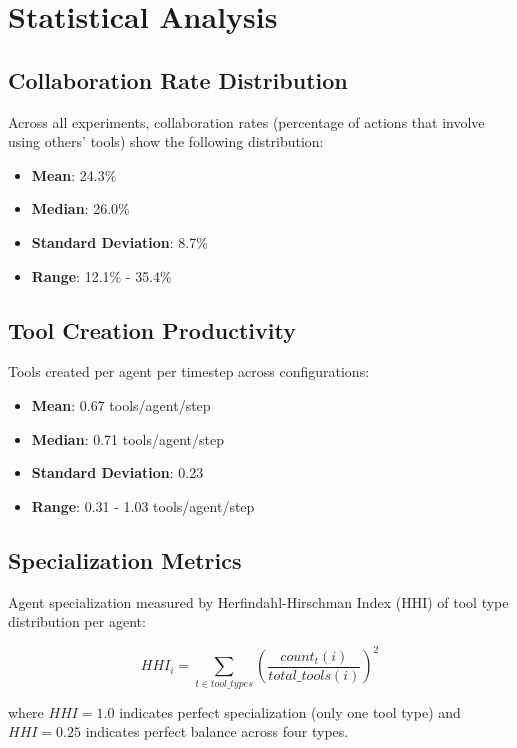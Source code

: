 \documentclass[10pt]{article}
\begin{document}
\section{Statistical Analysis}

\subsection{Collaboration Rate Distribution}

Across all experiments, collaboration rates (percentage of actions that involve using others' tools) show the following distribution:

\begin{itemize}
\item \textbf{Mean}: 24.3\%
\item \textbf{Median}: 26.0\%
\item \textbf{Standard Deviation}: 8.7\%
\item \textbf{Range}: 12.1\% - 35.4\%
\end{itemize}

\subsection{Tool Creation Productivity}

Tools created per agent per timestep across configurations:

\begin{itemize}
\item \textbf{Mean}: 0.67 tools/agent/step
\item \textbf{Median}: 0.71 tools/agent/step  
\item \textbf{Standard Deviation}: 0.23
\item \textbf{Range}: 0.31 - 1.03 tools/agent/step
\end{itemize}

\subsection{Specialization Metrics}

Agent specialization measured by Herfindahl-Hirschman Index (HHI) of tool type distribution per agent:

\begin{equation}
HHI_i = \sum_{t \in tool\_types} \left(\frac{count_t(i)}{total\_tools(i)}\right)^2
\end{equation}

where $HHI = 1.0$ indicates perfect specialization (only one tool type) and $HHI = 0.25$ indicates perfect balance across four types.
\end{document}
